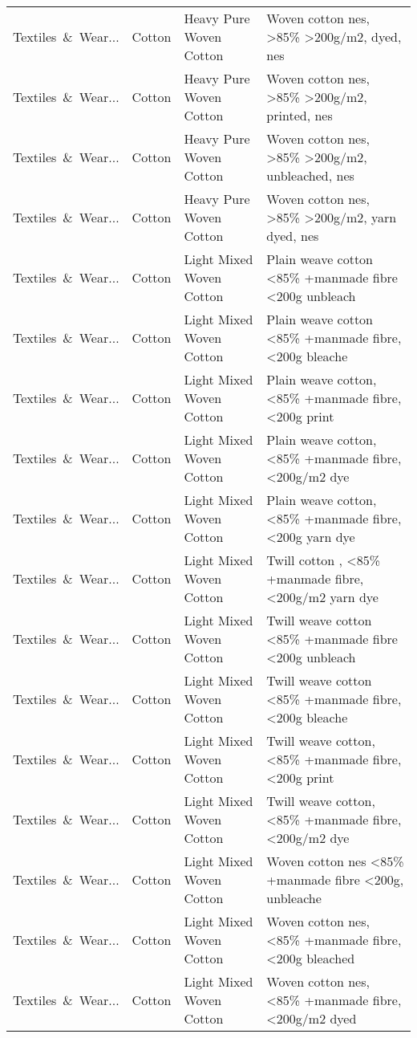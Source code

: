 \begin{appendices}
\begin{xltabular}{\textwidth}{|p{0.10\textwidth}|p{0.25\textwidth}|p{0.24\textwidth}|p{0.31\textwidth}|}
Textiles\ \&\ Wear... & Cotton & Heavy Pure Woven Cotton & Woven cotton nes, >85\% >200g/m2, dyed, nes \\
Textiles\ \&\ Wear... & Cotton & Heavy Pure Woven Cotton & Woven cotton nes, >85\% >200g/m2, printed, nes \\
Textiles\ \&\ Wear... & Cotton & Heavy Pure Woven Cotton & Woven cotton nes, >85\% >200g/m2, unbleached, nes \\
Textiles\ \&\ Wear... & Cotton & Heavy Pure Woven Cotton & Woven cotton nes, >85\% >200g/m2, yarn dyed, nes \\
Textiles\ \&\ Wear... & Cotton & Light Mixed Woven Cotton & Plain weave cotton <85\% +manmade fibre <200g unbleach \\
Textiles\ \&\ Wear... & Cotton & Light Mixed Woven Cotton & Plain weave cotton <85\% +manmade fibre, <200g bleache \\
Textiles\ \&\ Wear... & Cotton & Light Mixed Woven Cotton & Plain weave cotton, <85\% +manmade fibre, <200g print \\
Textiles\ \&\ Wear... & Cotton & Light Mixed Woven Cotton & Plain weave cotton, <85\% +manmade fibre, <200g/m2 dye \\
Textiles\ \&\ Wear... & Cotton & Light Mixed Woven Cotton & Plain weave cotton,<85\% +manmade fibre,<200g yarn dye \\
Textiles\ \&\ Wear... & Cotton & Light Mixed Woven Cotton & Twill cotton , <85\% +manmade fibre, <200g/m2 yarn dye \\
Textiles\ \&\ Wear... & Cotton & Light Mixed Woven Cotton & Twill weave cotton <85\% +manmade fibre <200g unbleach \\
Textiles\ \&\ Wear... & Cotton & Light Mixed Woven Cotton & Twill weave cotton <85\% +manmade fibre, <200g bleache \\
Textiles\ \&\ Wear... & Cotton & Light Mixed Woven Cotton & Twill weave cotton, <85\% +manmade fibre, <200g print \\
Textiles\ \&\ Wear... & Cotton & Light Mixed Woven Cotton & Twill weave cotton, <85\% +manmade fibre, <200g/m2 dye \\
Textiles\ \&\ Wear... & Cotton & Light Mixed Woven Cotton & Woven cotton nes <85\% +manmade fibre <200g, unbleache \\
Textiles\ \&\ Wear... & Cotton & Light Mixed Woven Cotton & Woven cotton nes, <85\% +manmade fibre, <200g bleached \\
Textiles\ \&\ Wear... & Cotton & Light Mixed Woven Cotton & Woven cotton nes, <85\% +manmade fibre, <200g/m2 dyed \\

\end{xltabular}
\end{appendices}
